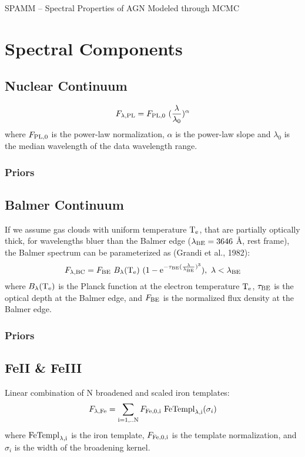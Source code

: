 \documentclass[12pt,letterpaper]{article}
\begin{document}
\begin{center}
{\large SPAMM -- Spectral Properties of AGN Modeled through MCMC }
\end{center}
\vspace{0.05in}

\section*{Spectral Components}
\subsection*{Nuclear Continuum}
\begin{equation}
F_{\lambda,{\rm PL}}=F_{\rm PL,0} \ (\frac{\lambda}{\lambda_0})^{\alpha} 
\end{equation}
where $F_{\rm PL,0}$ is the power-law normalization, $\alpha$ is the power-law slope and $\lambda_0$ is the median wavelength 
of the data wavelength range. 
\subsubsection*{Priors}

\subsection*{Balmer Continuum}
If we assume gas clouds with uniform temperature $\rm{T}_{\rm{e}}$, that are partially optically thick, for wavelengths bluer 
than the Balmer edge ($\lambda_{\rm{BE}}=3646$ \AA, rest frame), the Balmer spectrum can be parameterized as 
(Grandi et al., 1982): 
\begin{equation}
F_{\lambda,{\rm BC}}= F_{{\rm BE}} \ B_{\lambda}({\rm T}_{{\rm e}}) \ (1-{\rm e}^{-\tau_{{\rm BE}}(\frac{\lambda}{\lambda_{{\rm BE}}})^3}), \ \lambda<\lambda_{\rm{BE}}
\end{equation}
where $B_{\lambda}({\rm T}_{{\rm e}})$ is the Planck function at the electron temperature 
${\rm T}_{{\rm e}}$, $\tau_{{\rm BE}}$ is the optical 
depth at the Balmer edge, and $F_{{\rm BE}}$ is the normalized flux density at the Balmer edge.
\subsubsection*{Priors}

\subsection*{FeII \& FeIII}
Linear combination of N broadened and scaled iron templates:
\begin{equation}
F_{\lambda {\rm{,Fe}}} = \sum_{\rm i=1,..N} F_{\rm{Fe,0,i}} \  {\rm FeTempl}_{\rm{\lambda,i}}(\sigma_i) 
\end{equation}
where ${\rm FeTempl}_{\rm{\lambda,i}}$ is the iron template, $F_{\rm Fe,0,i}$ is the template normalization, and $\sigma_i$ is the 
width of the broadening kernel.
\end{document}
